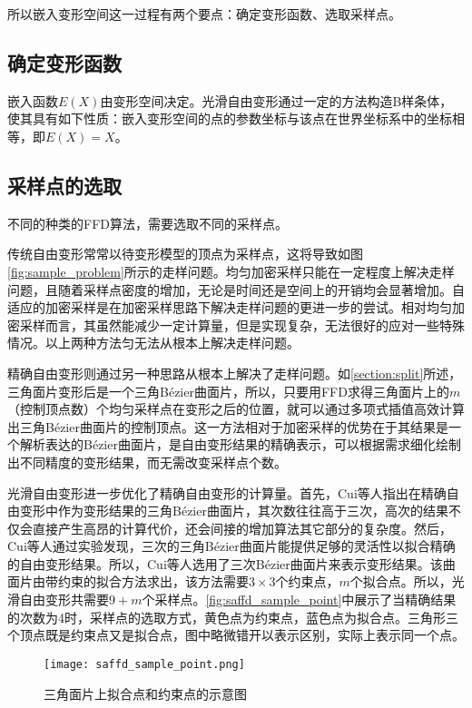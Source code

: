 所以嵌入变形空间这一过程有两个要点：确定变形函数、选取采样点。

\subsection{确定变形函数}
嵌入函数$E(X)$由变形空间决定。光滑自由变形通过一定的方法构造B样条体，使其具有如下性质：嵌入变形空间的点的参数坐标与该点在世界坐标系中的坐标相等，即$E(X)=X$\cite{Feng02}。

\subsection{采样点的选取}
不同的种类的FFD算法，需要选取不同的采样点。

传统自由变形常常以待变形模型的顶点为采样点，这将导致如图\autoref{fig:sample_problem}所示的走样问题。均匀加密采样只能在一定程度上解决走样问题，且随着采样点密度的增加，无论是时间还是空间上的开销均会显著增加。自适应的加密采样是在加密采样思路下解决走样问题的更进一步的尝试\cite{parry1986, gain1999, griessmair1989deformation}。相对均匀加密采样而言，其虽然能减少一定计算量，但是实现复杂，无法很好的应对一些特殊情况。以上两种方法匀无法从根本上解决走样问题。

精确自由变形\cite{Feng00}则通过另一种思路从根本上解决了走样问题。如\ref{section:split}所述，三角面片变形后是一个三角Bézier曲面片，所以，只要用FFD求得三角面片上的$m$（控制顶点数）个均匀采样点在变形之后的位置，就可以通过多项式插值高效计算出三角Bézier曲面片的控制顶点。这一方法相对于加密采样的优势在于其结果是一个解析表达的Bézier曲面片，是自由变形结果的精确表示，可以根据需求细化绘制出不同精度的变形结果，而无需改变采样点个数。

光滑自由变形\cite{Cui15}进一步优化了精确自由变形的计算量。首先，Cui等人指出在精确自由变形中作为变形结果的三角Bézier曲面片，其次数往往高于三次，高次的结果不仅会直接产生高昂的计算代价，还会间接的增加算法其它部分的复杂度。然后，Cui等人通过实验发现，三次的三角Bézier曲面片能提供足够的灵活性以拟合精确的自由变形结果。所以，Cui等人选用了三次Bézier曲面片来表示变形结果。该曲面片由带约束的拟合方法求出，该方法需要$3\times3$个约束点，$m$个拟合点。所以，光滑自由变形共需要$9+m$个采样点。\autoref{fig:saffd_sample_point}中展示了当精确结果的次数为4时，采样点的选取方式，黄色点为约束点，蓝色点为拟合点。三角形三个顶点既是约束点又是拟合点，图中略微错开以表示区别，实际上表示同一个点。

\begin{figure}[htbp]
	\centering
	\texttt{[image: saffd\_sample\_point.png]}
    \caption{三角面片上拟合点和约束点的示意图}\label{fig:saffd_sample_point}
\end{figure}


